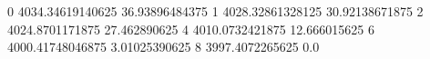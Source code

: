 0 4034.34619140625 36.93896484375
1 4028.32861328125 30.92138671875
2 4024.8701171875 27.462890625
4 4010.0732421875 12.666015625
6 4000.41748046875 3.01025390625
8 3997.4072265625 0.0
